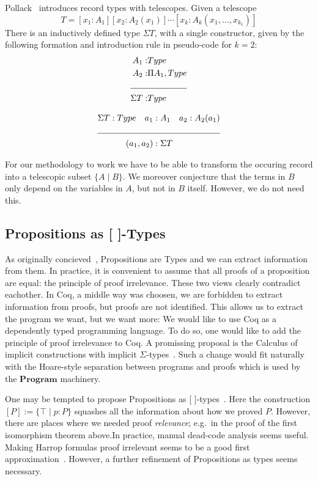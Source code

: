 \documentclass[a4paper,10pt, runningheads]{llncs}
\newcommand{\Conid}[1]{\mathit{#1}}
\begin{document}
Pollack~\cite{pollack2000dependently} introduces record types with telescopes. 
Given a telescope\[
T=[x_1:A_1][x_2:A_2(x_1)]\cdots[x_k:A_k(x_1,\ldots,x_{k_1})]
\]
There is an inductively defined type $\Sigma T$, with a single constructor, given by the following 
formation and introduction rule in pseudo-code for $k=2$:
\begin{align*}
 A_1 :& Type\\
 A_2 :& \Pi A_1,Type\\
\cline{1-2}
\Sigma T :& Type
\end{align*}

\begin{align*}
 \Sigma T:Type\quad a_1 &:A_1 \quad a_2 : A_2(a_1)\\
\cline{1-3}
(a_1,a_2) &:\Sigma T
\end{align*}

For our methodology to work we have to be able to transform the occuring record into a telescopic
subset $\{ A \mid  B\}$. We moreover conjecture that the terms in \ensuremath{\Conid{B}} only depend on the
variables in \ensuremath{\Conid{A}}, but not in \ensuremath{\Conid{B}} itself. However, we do not need this.

\subsection{Propositions as [ ]-Types}\label{explicit}
As originally concieved~\cite{ITT,CMCP}, Propositions are Types and we can extract information from
them. In practice, it is convenient to assume that all proofs of a proposition are equal: the
principle of proof irrelevance. These two views clearly contradict eachother. In Coq, a middle way
was choosen, we are forbidden to extract information from proofs, but proofs are not identified.
This allows us to extract the program we want, but we want more:
We would like to use Coq as a dependently typed programming language. To do so,
one would like to add the principle of proof irrelevance to Coq. A promissing proposal is the
Calculus of implicit constructions with implicit
$\Sigma$-types~\cite{miquel2001implicit,barras2008implicit,barrasSigma}. Such a change would fit
naturally with the Hoare-style separation between programs and proofs which is used by the \ensuremath{\mathbf{Program}}
machinery. 

One may be tempted to propose Propositions as [ ]-types~\cite{awodey2004propositions}. Here the
construction $[P]:=\{\top\mid p:P\}$ squashes all the information about how we proved $P$. However,
there are places where we needed proof \emph{relevance}; e.g.\ in the proof of the first isomorphism
theorem above.In practice, manual dead-code analysis seems useful. Making Harrop formulas proof
irrelevant seems to be a good first approximation~\cite{lcf:spi:03}. However, a further refinement
of Propositions as types seems necessary.
\end{document}
